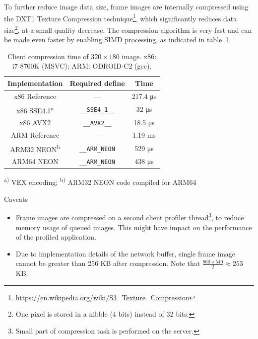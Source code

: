 \documentclass[hidelinks,titlepage,a4paper]{article}
\begin{document}
To further reduce image data size, frame images are internally compressed using the DXT1 Texture Compression technique\footnote{\url{https://en.wikipedia.org/wiki/S3_Texture_Compression}}, which significantly reduces data size\footnote{One pixel is stored in a nibble (4 bits) instead of 32 bits.}, at a small quality decrease. The compression algorithm is very fast and can be made even faster by enabling SIMD processing, as indicated in table~\ref{EtcSimd}.

\begin{table}[h]
\centering
\begin{tabular}[h]{c|c|c}
\textbf{Implementation} & \textbf{Required define} & \textbf{Time} \\ \hline
x86 Reference & --- & 217.4 \si{\micro\second} \\
x86 SSE4.1\textsuperscript{a} & \texttt{\_\_SSE4\_1\_\_} & 32 \si{\micro\second} \\
x86 AVX2 & \texttt{\_\_AVX2\_\_} & 18.5 \si{\micro\second} \\
ARM Reference & --- & 1.19 \si{\milli\second} \\
ARM32 NEON\textsuperscript{b} & \texttt{\_\_ARM\_NEON} & 529 \si{\micro\second} \\
ARM64 NEON & \texttt{\_\_ARM\_NEON} & 438 \si{\micro\second}
\end{tabular}

\vspace{1em}
\textsuperscript{a)} VEX encoding; \hspace{0.5em} \textsuperscript{b)} ARM32 NEON code compiled for ARM64
\caption{Client compression time of $320\times180$ image. x86: i7 8700K (MSVC); ARM: ODROID-C2 (gcc).}
\label{EtcSimd}
\end{table}

\begin{bclogo}[
noborder=true,
couleur=black!5,
logo=\bcattention
]{Caveats}
\begin{itemize}
\item Frame images are compressed on a second client profiler thread\footnote{Small part of compression task is performed on the server.}, to reduce memory usage of queued images. This might have impact on the performance of the profiled application.
\item Due to implementation details of the network buffer, single frame image cannot be greater than 256 KB after compression. Note that $\frac{960\times540}{2} \approx 253$ KB.
\end{itemize}
\end{bclogo}
\end{document}
